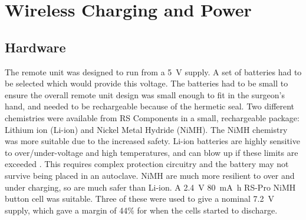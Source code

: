 \section{Wireless Charging and Power}\label{power}

\subsection{Hardware}

The remote unit was designed to run from a \SI{5}{\volt} supply. A set of batteries had to be selected which would provide this voltage. The batteries had to be small to ensure the overall remote unit design was small enough to fit in the surgeon's hand, and needed to be rechargeable because of the hermetic seal. Two different chemistries were available from RS Components \cite{rs} in a small, rechargeable package: Lithium ion (Li-ion) and Nickel Metal Hydride (NiMH). The NiMH chemistry was more suitable due to the increased safety. Li-ion batteries are highly sensitive to over/under-voltage and high temperatures, and can blow up if these limits are exceeded \cite{batteries}. This requires complex protection circuitry and the battery may not survive being placed in an autoclave. NiMH are much more resilient to over and under charging, so are much safer than Li-ion. A \SI{2.4}{\volt} \SI{80}{\milli\ampere\hour} RS-Pro NiMH button cell \cite{rs_pro_batteries} was suitable. Three of these were used to give a nominal \SI{7.2}{\volt} supply, which gave a margin of 44\% for when the cells started to discharge.\\

